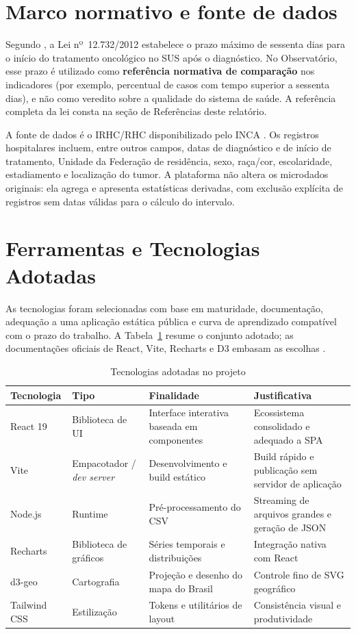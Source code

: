 \section{Marco normativo e fonte de dados}

Segundo , a Lei nº~12.732/2012 estabelece o prazo máximo de sessenta dias para o início do tratamento oncológico no \acs{SUS} após o diagnóstico. No Observatório, esse prazo é utilizado como \textbf{referência normativa de comparação} nos indicadores (por exemplo, percentual de casos com tempo superior a sessenta dias), e não como veredito sobre a qualidade do sistema de saúde. A referência completa da lei consta na seção de Referências deste relatório.

A fonte de dados é o \acs{IRHC}/\acs{RHC} disponibilizado pelo \acs{INCA} \cite{inca_irhc}. Os registros hospitalares incluem, entre outros campos, datas de diagnóstico e de início de tratamento, Unidade da Federação de residência, sexo, raça/cor, escolaridade, estadiamento e localização do tumor. A plataforma não altera os microdados originais: ela agrega e apresenta estatísticas derivadas, com exclusão explícita de registros sem datas válidas para o cálculo do intervalo.

\section{Ferramentas e Tecnologias Adotadas}

As tecnologias foram selecionadas com base em maturidade, documentação, adequação a uma aplicação estática pública e curva de aprendizado compatível com o prazo do trabalho. A Tabela~\ref{tab:tecnologias} resume o conjunto adotado; as documentações oficiais de React, Vite, Recharts e D3 embasam as escolhas \cite{react_docs,vite_docs,recharts_docs,d3_docs}.

\begin{table}[H]
\centering
\caption{Tecnologias adotadas no projeto}
\label{tab:tecnologias}
\begin{tabularx}{\textwidth}{|l|l|X|X|}
\hline
\textbf{Tecnologia} & \textbf{Tipo} & \textbf{Finalidade} & \textbf{Justificativa} \\
\hline
React 19 & Biblioteca de \acs{UI} & Interface interativa baseada em componentes & Ecossistema consolidado e adequado a \acs{SPA} \\
\hline
Vite & Empacotador / \textit{dev server} & Desenvolvimento e build estático & Build rápido e publicação sem servidor de aplicação \\
\hline
Node.js & Runtime & Pré-processamento do \acs{CSV} & Streaming de arquivos grandes e geração de \acs{JSON} \\
\hline
Recharts & Biblioteca de gráficos & Séries temporais e distribuições & Integração nativa com React \\
\hline
d3-geo & Cartografia & Projeção e desenho do mapa do Brasil & Controle fino de \acs{SVG} geográfico \\
\hline
Tailwind CSS & Estilização & Tokens e utilitários de layout & Consistência visual e produtividade \\
\hline
\end{tabularx}
\end{table}

